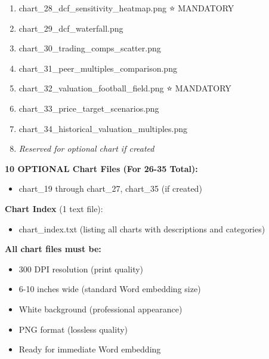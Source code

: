 \documentclass[11pt]{article}
\begin{document}
\begin{enumerate}[leftmargin=*,itemsep=2pt,topsep=2pt]
\item {} chart\_\allowbreak{}28\_\allowbreak{}dcf\_\allowbreak{}sensitivity\_\allowbreak{}heatmap.png ⭐ MANDATORY
\item {} chart\_\allowbreak{}29\_\allowbreak{}dcf\_\allowbreak{}waterfall.png
\item {} chart\_\allowbreak{}30\_\allowbreak{}trading\_\allowbreak{}comps\_\allowbreak{}scatter.png
\item {} chart\_\allowbreak{}31\_\allowbreak{}peer\_\allowbreak{}multiples\_\allowbreak{}comparison.png
\item {} chart\_\allowbreak{}32\_\allowbreak{}valuation\_\allowbreak{}football\_\allowbreak{}field.png ⭐ MANDATORY
\item {} chart\_\allowbreak{}33\_\allowbreak{}price\_\allowbreak{}target\_\allowbreak{}scenarios.png
\item {} chart\_\allowbreak{}34\_\allowbreak{}historical\_\allowbreak{}valuation\_\allowbreak{}multiples.png
\item {} \emph{Reserved for optional chart if created}
\end{enumerate}

\textbf{10 OPTIONAL Chart Files (For 26-35 Total):}

\begin{itemize}[leftmargin=*,itemsep=2pt,topsep=2pt]
\item {} chart\_\allowbreak{}19 through chart\_\allowbreak{}27, chart\_\allowbreak{}35 (if created)
\end{itemize}

\textbf{Chart Index} (1 text file):

\begin{itemize}[leftmargin=*,itemsep=2pt,topsep=2pt]
\item {} chart\_\allowbreak{}index.txt (listing all charts with descriptions and categories)
\end{itemize}

\textbf{All chart files must be:}

\begin{itemize}[leftmargin=*,itemsep=2pt,topsep=2pt]
\item {} 300 DPI resolution (print quality)
\item {} 6-10 inches wide (standard Word embedding size)
\item {} White background (professional appearance)
\item {} PNG format (lossless quality)
\item {} Ready for immediate Word embedding
\end{itemize}
\end{document}
